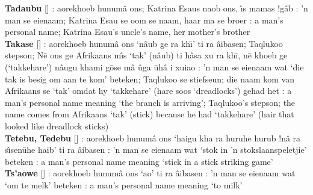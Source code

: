 \textbf{Tadaubu} [] : aorekhoeb
\textdoublebarpipe{}hunum\^{a} \textvertline{}ons; Katrina Esaus
\textdoublevertline{}naob \textvertline{}ons, 
\textdoublevertline{}\^{\i}s mamas !g\^{a}b
: 'n man se eienaam; Katrina Esau se oom se naam, haar
ma se broer : a man's personal name; Katrina Esau's
uncle's name, her mother's brother \\

\textbf{Takase} [] : aorekhoeb
\textdoublebarpipe{}hunum\^{a} \textvertline{}ons
`\textdoublevertline{}n\^{a}ub ge ra \textvertline{}kh\={\i}' ti ra
\textdoublebarpipe{}\^{a}ibasen; Taqlukoo stepson; N\={e}
\textvertline{}ons ge Afrikaans m\^{\i}s `tak'
(\textdoublevertline{}n\^{a}ub) ti h\^{a}sa xu ra
\textvertline{}kh\={\i}, n\={e} khoeb ge (`takkehare')
\textdoublevertline{}n\^{a}ugu khami \textdoublebarpipe{}g\={o}se
m\^{a} \textvertline{}\^{u}ga \={u}h\^{a} i xuiao : 'n
man se eienaam wat `die tak is besig om aan te kom' beteken; Taqlukoo
se stiefseun; die naam kom van Afrikaans se `tak' omdat hy `takkehare'
(hare soos `dreadlocks') gehad het : a man's personal
name meaning `the branch is arriving'; Taqlukoo's stepson; the name
comes from Afrikaans `tak' (stick) because he had `takkehare' (hair
that looked like dreadlock sticks) \\

\textbf{Tetebu, Tedebu} [] :
aorekhoeb \textdoublebarpipe{}hunum\^{a} \textvertline{}ons `haigu
\textvertline{}kha ra \textvertline{}huruhe \textvertline{}hurub
!n\^{a} ra s\^{\i}sen\={u}he haib' ti ra
\textdoublebarpipe{}\^{a}ibasen : 'n man se eienaam wat
`stok in 'n stokslaanspeletjie' beteken : a man's
personal name meaning `stick in a stick striking game' \\

\textbf{Ts'aowe} [] :
aorekhoeb \textdoublebarpipe{}hunum\^{a} \textvertline{}ons
`\textvertline{}ao' ti ra \textdoublebarpipe{}\^{a}ibasen
: 'n man se eienaam wat `om te melk' beteken
: a man's personal name meaning `to milk' \\

